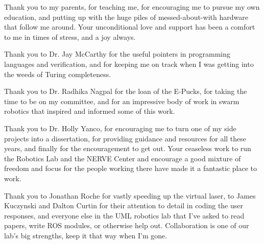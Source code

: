 Thank you to my parents, for teaching me, for encouraging me to pursue my own education, and putting up with the huge piles of messed-about-with hardware that follow me around. Your unconditional love and support has been a comfort to me in times of stress, and a joy always.

Thank you to Dr. Jay McCarthy for the useful pointers in programming languages and verification, and for keeping me on track when I was getting into the weeds of Turing completeness. 

Thank you to Dr. Radhika Nagpal for the loan of the E-Pucks, for taking the time to be on my committee, and for an impressive body of work in swarm robotics that inspired and informed some of this work. 

Thank you to Dr. Holly Yanco, for encouraging me to turn one of my side projects into a dissertation, for providing guidance and resources for all these years, and finally for the encouragement to get out. Your ceaseless work to run the Robotics Lab and the NERVE Center and encourage a good mixture of freedom and focus for the people working there have made it a fantastic place to work. 

Thank you to Jonathan Roche for vastly speeding up the virtual laser, to James Kuczynski and Dalton Curtin for their attention to detail in coding the user responses, and everyone else in the UML robotics lab that I've asked to read papers, write ROS modules, or otherwise help out. Collaboration is one of our lab's big strengths, keep it that way when I'm gone.  

